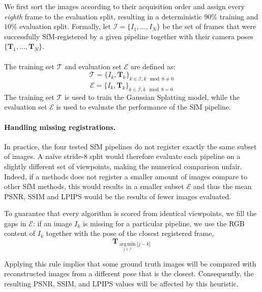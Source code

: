 We first sort the images according to their acquisition order and assign every
\emph{eighth} frame to the evaluation split, resulting in a deterministic $90\%$ training and $10\%$ evaluation split.
Formally, let $\mathcal{I}=\{I_1,\dots,I_N\}$ be the set of frames that were successfully SfM-registered by a given pipeline together with their camera poses
$\{\mathbf{T}_1,\dots,\mathbf{T}_N\}$. \\
\\
The training set $\mathcal{T}$ and evaluation set $\mathcal{E}$ are defined as:
\begin{equation}
  \mathcal{T} = \{I_k, \mathbf{T}_k\}_{k \in \mathcal{I}, k \mod 8 \neq 0}\,
\end{equation}
\begin{equation}
  \mathcal{E} = \{I_k, \mathbf{T}_k\}_{k \in \mathcal{I}, k \mod 8 = 0}\,
\end{equation}
The training set $\mathcal{T}$ is used to train the Gaussian Splatting model, while the evaluation set $\mathcal{E}$ is used to evaluate the performance of the SfM pipeline.

\paragraph{Handling missing registrations.}
In practice, the four tested SfM pipelines do not register exactly the same subset of images.  
A naïve stride-8 split would therefore evaluate each pipeline on a slightly different set of viewpoints, making the numerical comparison unfair.
Indeed, if a methods does not register a smaller amount of images compare to other SfM methods, this would results in a smaller subset $\mathcal{E}$ and thus the mean PSNR, SSIM and LPIPS would be the results of fewer images evaluated.

To guarantee that every algorithm is scored from identical viewpoints, we fill the gaps in $\mathcal{E}$: 
if an image $I_k$ is missing for a particular pipeline, we use the RGB content of $I_k$ together with the pose of the closest registered frame,
\begin{equation}
  \mathbf{T}_{\operatorname*{arg\,min}_{j\in\mathcal{I}} |j-k| }\,
\end{equation}

Applying this rule implies that some ground truth images will be compared with reconstructed images from a different pose that is the closest. 
Consequently, the resulting PSNR, SSIM, and LPIPS values will be affected by this heuristic.

